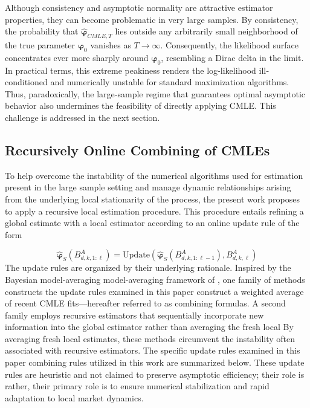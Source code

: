 \documentclass[10pt,a4paper,oneside]{article}
\providecommand{\DIFaddtex}[1]{{\protect\color{blue} \sf #1}} %
\providecommand{\DIFdeltex}[1]{{\protect\color{red} \scriptsize #1}} %
\providecommand{\DIFaddbegin}{} %
\providecommand{\DIFaddend}{} %
\providecommand{\DIFdelbegin}{} %
\providecommand{\DIFdelend}{} %
\providecommand{\DIFadd}[1]{\texorpdfstring{\DIFaddtex{#1}}{#1}} %
\providecommand{\DIFdel}[1]{\texorpdfstring{\DIFdeltex{#1}}{}} %
\newcommand{\DIFscaledelfig}{0.5}
\newlength{\DIFdelgraphicswidth} %
\newlength{\DIFdelgraphicsheight} %
\newcommand{\DIFaddincludegraphics}[2][]{{\color{blue}\fbox{\DIFOincludegraphics[#1]{#2}}}} %
\newcommand{\DIFdelincludegraphics}[2][]{%
\sbox{\DIFdelgraphicsbox}{\DIFOincludegraphics[#1]{#2}}%
\settoboxwidth{\DIFdelgraphicswidth}{\DIFdelgraphicsbox} %
\settoboxtotalheight{\DIFdelgraphicsheight}{\DIFdelgraphicsbox} %
\scalebox{\DIFscaledelfig}{%
\parbox[b]{\DIFdelgraphicswidth}{\usebox{\DIFdelgraphicsbox}\\[-\baselineskip] \rule{\DIFdelgraphicswidth}{0em}}\llap{\resizebox{\DIFdelgraphicswidth}{\DIFdelgraphicsheight}{%
\setlength{\unitlength}{\DIFdelgraphicswidth}%
\begin{picture}(1,1)%
\thicklines\linethickness{2pt} %
{\color[rgb]{1,0,0}\put(0,0){\framebox(1,1){}}}%
{\color[rgb]{1,0,0}\put(0,0){\line( 1,1){1}}}%
{\color[rgb]{1,0,0}\put(0,1){\line(1,-1){1}}}%
\end{picture}%
}\hspace*{3pt}}} %
} %
\DeclareRobustCommand{\DIFaddbegin}{\DIFOaddbegin \let\includegraphics\DIFaddincludegraphics} %
\DeclareRobustCommand{\DIFaddend}{\DIFOaddend \let\includegraphics\DIFOincludegraphics} %
\DeclareRobustCommand{\DIFdelbegin}{\DIFOdelbegin \let\includegraphics\DIFdelincludegraphics} %
\DeclareRobustCommand{\DIFdelend}{\DIFOaddend \let\includegraphics\DIFOincludegraphics} %
\begin{document}
Although consistency and asymptotic normality are attractive estimator properties, they can become problematic in very large samples.  By consistency, the probability that \(\hat{\boldsymbol{\varphi}}_{CMLE,T}\) lies outside any arbitrarily small neighborhood of the true parameter \(\boldsymbol{\varphi}_0\) vanishes as \(T\to\infty\).  Consequently, the likelihood surface concentrates ever more sharply around \(\boldsymbol{\varphi}_0\), resembling a Dirac delta in the limit.  In practical terms, this extreme peakiness renders the log‐likelihood ill‐conditioned and numerically unstable for standard maximization algorithms.  Thus, paradoxically, the large‐sample regime that guarantees optimal asymptotic behavior also undermines the feasibility of directly applying CMLE. This challenge is addressed in the next section.


\subsection{Recursively Online Combining of CMLEs}
\label{subsec:combining_cmles}

To help overcome the instability of the numerical algorithms used for estimation present in the large sample setting and manage dynamic relationships arising from the underlying local stationarity of the process, the present work proposes to apply a recursive local estimation procedure. This procedure entails refining a global estimate with a local estimator according to an online update rule of the form

$$
    \hat{\boldsymbol{\varphi}}_S\left( B^A_{d,k,1:\ell} \right) = \mathrm{Update}\left( \hat{\boldsymbol{\varphi}}_S\left( B^A_{d,k,1:\ell - 1} \right),  B^A_{d,k,\ell} \right)
$$
\DIFdelbegin \DIFdel{The update rules are organized by their underlying rationale.  }\DIFdelend Inspired by the Bayesian \DIFdelbegin \DIFdel{model‐averaging }\DIFdelend \DIFaddbegin \DIFadd{model-averaging }\DIFaddend framework of \cite{madigan2003bayesian}, \DIFdelbegin \DIFdel{one family of methods constructs }\DIFdelend \DIFaddbegin \DIFadd{the update rules examined in this paper construct }\DIFaddend a weighted average of recent CMLE fits—hereafter referred to as combining formulas. \DIFdelbegin \DIFdel{A second family employs recursive estimators that sequentially incorporate new information into the global estimator rather than averaging the fresh local }\DIFdelend \DIFaddbegin \DIFadd{By averaging fresh local estimates, these methods circumvent the instability often associated with recursive }\DIFaddend estimators. The specific \DIFdelbegin \DIFdel{update rules examined in this paper }\DIFdelend \DIFaddbegin \DIFadd{combining rules utilized in this work }\DIFaddend are summarized below. These update rules are heuristic and not claimed to preserve asymptotic efficiency; \DIFdelbegin \DIFdel{their role is }\DIFdelend \DIFaddbegin \DIFadd{rather, their primary role is to ensure }\DIFaddend numerical stabilization and rapid adaptation \DIFaddbegin \DIFadd{to local market dynamics}\DIFaddend .
\end{document}
